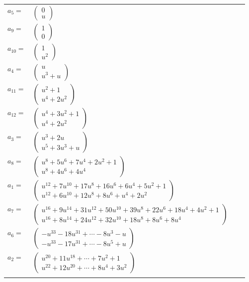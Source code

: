 \documentclass[1p]{elsarticle_modified}
\theoremstyle{definition}
\begin{document}
\begin{tabular}{m{7pt} m{180pt} m{7pt} m{180pt} }
\flushright $a_{5}=$&$\begin{pmatrix}0\\u\end{pmatrix}$ \\
\flushright $a_{9}=$&$\begin{pmatrix}1\\0\end{pmatrix}$ \\
\flushright $a_{10}=$&$\begin{pmatrix}1\\u^2\end{pmatrix}$ \\
\flushright $a_{4}=$&$\begin{pmatrix}u\\u^3+u\end{pmatrix}$ \\
\flushright $a_{11}=$&$\begin{pmatrix}u^2+1\\u^4+2 u^2\end{pmatrix}$ \\
\flushright $a_{12}=$&$\begin{pmatrix}u^4+3 u^2+1\\u^4+2 u^2\end{pmatrix}$ \\
\flushright $a_{3}=$&$\begin{pmatrix}u^3+2 u\\u^5+3 u^3+u\end{pmatrix}$ \\
\flushright $a_{8}=$&$\begin{pmatrix}u^8+5 u^6+7 u^4+2 u^2+1\\u^8+4 u^6+4 u^4\end{pmatrix}$ \\
\flushright $a_{1}=$&$\begin{pmatrix}u^{12}+7 u^{10}+17 u^8+16 u^6+6 u^4+5 u^2+1\\u^{12}+6 u^{10}+12 u^8+8 u^6+u^4+2 u^2\end{pmatrix}$ \\
\flushright $a_{7}=$&$\begin{pmatrix}u^{16}+9 u^{14}+31 u^{12}+50 u^{10}+39 u^8+22 u^6+18 u^4+4 u^2+1\\u^{16}+8 u^{14}+24 u^{12}+32 u^{10}+18 u^8+8 u^6+8 u^4\end{pmatrix}$ \\
\flushright $a_{6}=$&$\begin{pmatrix}- u^{33}-18 u^{31}+\cdots-8 u^3- u\\- u^{33}-17 u^{31}+\cdots-8 u^5+u\end{pmatrix}$ \\
\flushright $a_{2}=$&$\begin{pmatrix}u^{20}+11 u^{18}+\cdots+7 u^2+1\\u^{22}+12 u^{20}+\cdots+8 u^4+3 u^2\end{pmatrix}$\\&\end{tabular}
\end{document}
